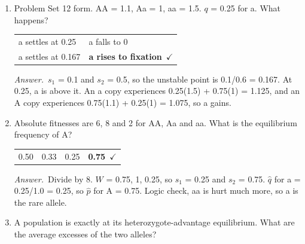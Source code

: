 \documentclass[11pt]{article}
\newcommand{\keyans}[1]{\par\medskip\noindent\textit{Answer.}\ #1\par\medskip}
\begin{document}
\begin{enumerate}[label=\textbf{\arabic*.}, leftmargin=2em, itemsep=1.4em]
\keyans{Fitness = 1.6, 1.8 and 2.0. \(\overline{W}\) = 0.4 + 0.9 + 0.5 = 1.8. \(q'\) = (0.45 + 0.50)/1.8 = 0.528, \(\Delta q\) = +0.028. Survival alone gives \(-\)0.083 and fecundity alone +0.115. Survival favors A but fecundity favors a more.}
\item Problem Set 12 form. AA = 1.1, Aa = 1, aa = 1.5. \(q\) = 0.25 for a. What happens?
\nopagebreak\par{}
\par\smallskip\noindent\begin{tabularx}{\linewidth}{@{}YY@{}}
a settles at 0.25 & a falls to 0 \\[3pt]
a settles at 0.167 & \textbf{a rises to fixation}\ \(\checkmark\) \\
\end{tabularx}
\keyans{\(s_1\) = 0.1 and \(s_2\) = 0.5, so the unstable point is 0.1/0.6 = 0.167. At 0.25, a is above it. An a copy experiences 0.25(1.5) + 0.75(1) = 1.125, and an A copy experiences 0.75(1.1) + 0.25(1) = 1.075, so a gains.}
\item Absolute fitnesses are 6, 8 and 2 for AA, Aa and aa. What is the equilibrium frequency of A?
\nopagebreak\par{}
\par\smallskip\noindent\begin{tabularx}{\linewidth}{@{}YYYY@{}}
0.50 & 0.33 & 0.25 & \textbf{0.75}\ \(\checkmark\) \\
\end{tabularx}
\keyans{Divide by 8. \(W\) = 0.75, 1, 0.25, so \(s_1\) = 0.25 and \(s_2\) = 0.75. \(\hat{q}\) for a = 0.25/1.0 = 0.25, so \(\hat{p}\) for A = 0.75. Logic check, aa is hurt much more, so a is the rare allele.}
\item A population is exactly at its heterozygote-advantage equilibrium. What are the average excesses of the two alleles?
\nopagebreak\par{}
\par\smallskip\noindent\begin{tabularx}{\linewidth}{@{}YY@{}}

\end{tabularx}
\end{enumerate}
\end{document}
